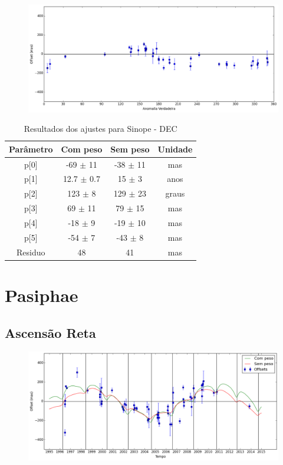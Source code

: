 \documentclass[11pt,a4paper]{report}
\begin{document}
\begin{figure}[h]
\includegraphics[scale=0.45]{Sinope/DEC_anom.png}  
\end{figure}

\begin{table}[h!]
\caption{\label{Tab: Sinope-DEC} Resultados dos ajustes para Sinope - DEC}
\begin{centering}
\begin{tabular}{cccc}
\hline
\hline
Parâmetro & Com peso & Sem peso & Unidade\tabularnewline
\hline
p[0] & -69 $\pm$ 11 & -38 $\pm$ 11 & mas\\
p[1] & 12.7 $\pm$ 0.7 & 15 $\pm$ 3 & anos\\
p[2] & 123 $\pm$ 8 & 129 $\pm$ 23 & graus\\
p[3] & 69 $\pm$ 11 & 79 $\pm$ 15 & mas\\
p[4] & -18 $\pm$ 9 & -19 $\pm$ 10 & mas\\
p[5] & -54 $\pm$ 7 & -43 $\pm$ 8 & mas\\
Residuo & 48 & 41 & mas\\
\hline 
\end{tabular} 
\par\end{centering}
\end{table}

\chapter*{Pasiphae}
\section*{Ascensão Reta}

\begin{figure}[h]
\includegraphics[scale=0.45]{Pasiphae/RA.png} 
\end{figure}
\end{document}
